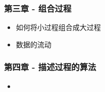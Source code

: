 \subsubsection*{第三章 - 组合过程}
\begin{itemize}
  \item 如何将小过程组合成大过程
  \item 数据的流动
\end{itemize}

\subsubsection*{第四章 - 描述过程的算法}
\begin{itemize}
  \item 
\end{itemize}